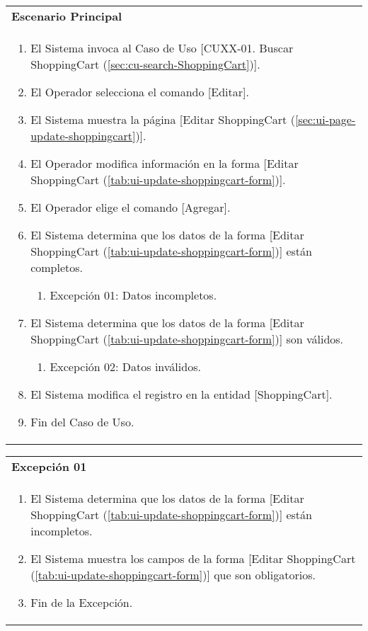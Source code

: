 	\begin{tabular}{ p{15.5cm} }
		\textbf{Escenario Principal} \\
		\begin{enumerate}
			\item El Sistema invoca al Caso de Uso [CUXX-01. Buscar ShoppingCart (\ref{sec:cu-search-ShoppingCart})].
			\item El Operador selecciona el comando [Editar].
			\item El Sistema muestra la p\'agina [Editar ShoppingCart (\ref{sec:ui-page-update-shoppingcart})].
			\item El Operador modifica informaci\'on en la forma [Editar ShoppingCart (\ref{tab:ui-update-shoppingcart-form})].
			\item El Operador elige el comando [Agregar].
			\item El Sistema determina que los datos de la forma [Editar ShoppingCart (\ref{tab:ui-update-shoppingcart-form})] est\'an completos.
				\begin{enumerate}
					\item Excepci\'on 01: Datos incompletos.
				\end{enumerate}
			\item El Sistema determina que los datos de la forma [Editar ShoppingCart (\ref{tab:ui-update-shoppingcart-form})] son v\'alidos.
				\begin{enumerate}
					\item Excepci\'on 02: Datos inv\'alidos.
				\end{enumerate}
			\item El Sistema modifica el registro en la entidad [ShoppingCart].
			\item Fin del Caso de Uso.
		\end{enumerate}
	\end{tabular}
	
	\begin{tabular}{ p{15.5cm} }
		\textbf{Excepci\'on 01} \\
		\begin{enumerate}
			\item El Sistema determina que los datos de la forma [Editar ShoppingCart (\ref{tab:ui-update-shoppingcart-form})] est\'an incompletos.
			\item El Sistema muestra los campos de la forma [Editar ShoppingCart (\ref{tab:ui-update-shoppingcart-form})] que son obligatorios.
			\item Fin de la Excepci\'on.
		\end{enumerate}
	\end{tabular}
	
